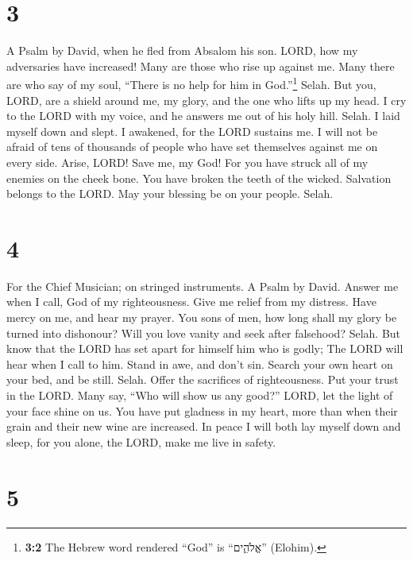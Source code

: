 \hypertarget{section-2}{%
\section{3}\label{section-2}}

A Psalm by David, when he fled from Absalom his son. 
LORD, how my adversaries have increased! Many are those who rise up
against me.  Many there are who say of my soul, ``There is
no help for him in God.''\footnote{\textbf{3:2} The Hebrew word rendered
  ``God'' is ``אֱלֹהִ֑ים'' (Elohim).} Selah.  But you,
LORD, are a shield around me, my glory, and the one who lifts up my
head.  I cry to the LORD with my voice, and he answers me
out of his holy hill. Selah.  I laid myself down and
slept. I awakened, for the LORD sustains me.  I will not
be afraid of tens of thousands of people who have set themselves against
me on every side.  Arise, LORD! Save me, my God! For you
have struck all of my enemies on the cheek bone. You have broken the
teeth of the wicked.  Salvation belongs to the LORD. May
your blessing be on your people. Selah.

\hypertarget{section-3}{%
\section{4}\label{section-3}}

For the Chief Musician; on stringed instruments. A Psalm by David.
 Answer me when I call, God of my righteousness. Give me
relief from my distress. Have mercy on me, and hear my prayer.
 You sons of men, how long shall my glory be turned into
dishonour? Will you love vanity and seek after falsehood? Selah.
 But know that the LORD has set apart for himself him who
is godly; The LORD will hear when I call to him.  Stand in
awe, and don't sin. Search your own heart on your bed, and be still.
Selah.  Offer the sacrifices of righteousness. Put your
trust in the LORD.  Many say, ``Who will show us any
good?'' LORD, let the light of your face shine on us.  You
have put gladness in my heart, more than when their grain and their new
wine are increased.  In peace I will both lay myself down
and sleep, for you alone, the LORD, make me live in safety.

\hypertarget{section-4}{%
\section{5}\label{section-4}}


